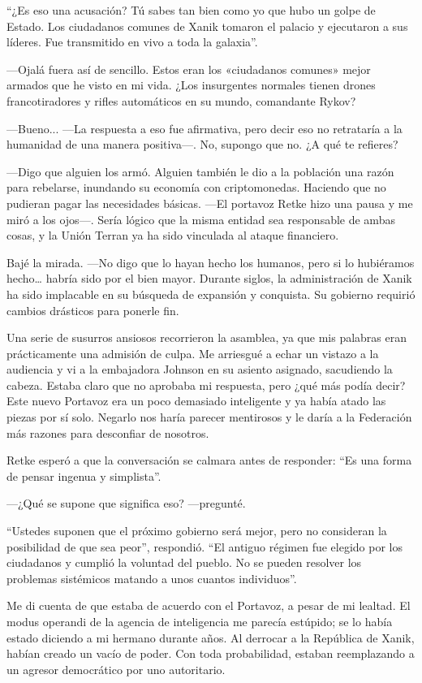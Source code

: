 ``¿Es eso una acusación? Tú sabes tan bien como yo que hubo un golpe de Estado. Los ciudadanos comunes de Xanik tomaron el palacio y ejecutaron a sus líderes. Fue transmitido en vivo a toda la galaxia''.

—Ojalá fuera así de sencillo. Estos eran los «ciudadanos comunes» mejor armados que he visto en mi vida. ¿Los insurgentes normales tienen drones francotiradores y rifles automáticos en su mundo, comandante Rykov?

—Bueno... —La respuesta a eso fue afirmativa, pero decir eso no retrataría a la humanidad de una manera positiva—. No, supongo que no. ¿A qué te refieres?

—Digo que alguien los armó. Alguien también le dio a la población una razón para rebelarse, inundando su economía con criptomonedas. Haciendo que no pudieran pagar las necesidades básicas. —El portavoz Retke hizo una pausa y me miró a los ojos—. Sería lógico que la misma entidad sea responsable de ambas cosas, y la Unión Terran ya ha sido vinculada al ataque financiero.

Bajé la mirada. —No digo que lo hayan hecho los humanos, pero si lo hubiéramos hecho… habría sido por el bien mayor. Durante siglos, la administración de Xanik ha sido implacable en su búsqueda de expansión y conquista. Su gobierno requirió cambios drásticos para ponerle fin.

Una serie de susurros ansiosos recorrieron la asamblea, ya que mis palabras eran prácticamente una admisión de culpa. Me arriesgué a echar un vistazo a la audiencia y vi a la embajadora Johnson en su asiento asignado, sacudiendo la cabeza. Estaba claro que no aprobaba mi respuesta, pero ¿qué más podía decir? Este nuevo Portavoz era un poco demasiado inteligente y ya había atado las piezas por sí solo. Negarlo nos haría parecer mentirosos y le daría a la Federación más razones para desconfiar de nosotros.

Retke esperó a que la conversación se calmara antes de responder: ``Es una forma de pensar ingenua y simplista''.

—¿Qué se supone que significa eso? —pregunté.

``Ustedes suponen que el próximo gobierno será mejor, pero no consideran la posibilidad de que sea peor'', respondió. ``El antiguo régimen fue elegido por los ciudadanos y cumplió la voluntad del pueblo. No se pueden resolver los problemas sistémicos matando a unos cuantos individuos''.

Me di cuenta de que estaba de acuerdo con el Portavoz, a pesar de mi lealtad. El modus operandi de la agencia de inteligencia me parecía estúpido; se lo había estado diciendo a mi hermano durante años. Al derrocar a la República de Xanik, habían creado un vacío de poder. Con toda probabilidad, estaban reemplazando a un agresor democrático por uno autoritario.

